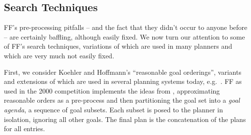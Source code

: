 \subsection{Search Techniques}
\label{sec:crisp-ff:preprocess:heuristics}





FF's pre-processing pitfalls -- and the fact that they didn't occur to
anyone before -- are certainly baffling, although easily fixed. We now
turn our attention to some of FF's search techniques, variations of
which are used in many planners and which are very much not easily
fixed.




First, we consider Koehler and Hoffmann's
 ``reasonable goal orderings'',
variants and extensions of which are used in several planning systems
today, e.g.\ \cite{hoffmann:etal:jair-04,richter:etal:aaai-08}. FF as
used in the 2000 competition implements the ideas from
\cite{koehler:hoffmann:jair-00}, approximating reasonable orders as a
pre-process and then partitioning the goal set into a {\em goal
  agenda}, a sequence of goal subsets. Each subset is posed to the
planner in isolation, ignoring all other goals. The final plan is the
concatenation of the plans for all entries.


